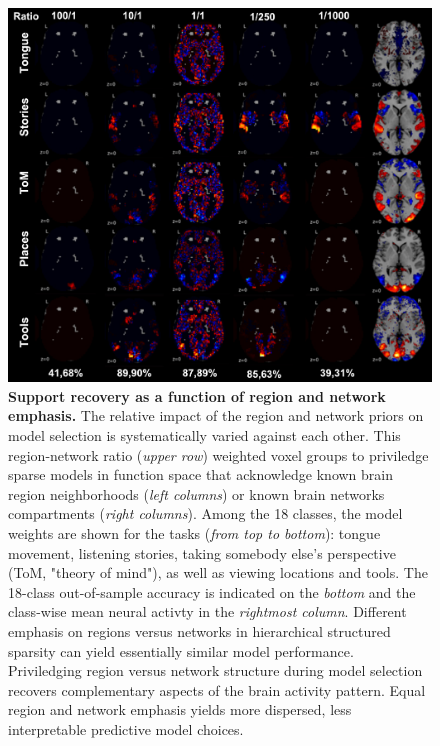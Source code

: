 \documentclass{article} %
\begin{document}
\begin{figure}
\begin{centering}
\includegraphics[width=1.00\textwidth]{figures/reg_net_ratio.pdf}
\end{centering}
\vspace{-0.6cm}
\caption{\textbf{Support recovery as a function of
region and network emphasis.}
The relative impact of the region and network priors
on model selection
is systematically varied against each other.
This region-network ratio (\textit{upper row}) weighted voxel groups
to priviledge sparse models in function space
that acknowledge known brain region neighborhoods
(\textit{left columns}) or
known brain networks compartments
(\textit{right columns}).
Among the 18 classes, the model weights are shown for the
tasks (\textit{from top to bottom}): tongue movement, listening stories,
taking somebody else's perspective (ToM, "theory of mind"),
as well as
viewing locations and tools.
The 18-class out-of-sample accuracy is indicated
on the \textit{bottom} and
the class-wise mean neural activty
in the \textit{rightmost column}.
%
Different emphasis on regions versus networks
in hierarchical structured sparsity can
yield essentially similar model performance.
%
Priviledging region versus network structure during model selection
recovers complementary aspects of the brain activity pattern.
%
Equal region and network emphasis yields more dispersed,
less interpretable predictive model choices.
}
\label{fig_regnetratio}
\end{figure}
\end{document}

